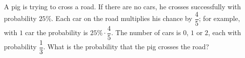 A pig is trying to cross a road. If there are no cars, he crosses successfully with probability $25\%$. Each car on the road multiplies his chance by $\dfrac45$; for example, with $1$ car the probability is $25\%\cdot\dfrac45$. The number of cars is $0$, $1$ or $2$, each with probability $\dfrac13$. What is the probability that the pig crosses the road?
